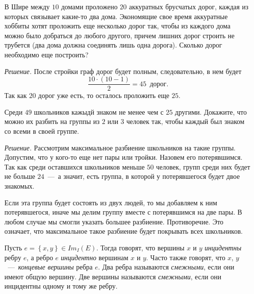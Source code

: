 \begin{example}
	В Шире между $10$ домами проложено $20$ аккуратных брусчатых дорог, каждая из которых связывает какие-то два дома. Экономящие свое время аккуратные хоббиты хотят проложить еще несколько дорог так, чтобы из каждого дома можно было добраться до любого другого, причем лишних дорог строить не трубется (два дома должна соединять лишь одна дорога). Сколько дорог необходимо еще построить?
	
	\emph{Решение.} После стройки граф дорог будет полным, следовательно, в нем будет 
	$$\frac{10 \cdot (10-1)}{2} = 45 \;\ \text{дорог}.$$
	Так как $20$ дорог уже есть, то осталось проложить еще $25$.
\end{example}

\begin{example}
	Среди $49$ школьников кажыдй знаком не менее чем с $25$ другими. Докажите, что можно их разбить на группы из $2$ или $3$ человек так, чтобы каждый был знаком со всеми в своей группе.
	
	\emph{Решение.} Рассмотрим максимальное разбиение школьников на такие группы. Допустим, что у кого-то еще нет пары или тройки. Назовем его потерявшимся. Так как среди оставшихся школьников меньше $50$ человек, групп среди них будет не больше $24$~---~а значит, есть группа, в которой у потерявшегося будет двое знакомых.
	
	Если эта группа будет состоять из двух людей, то мы добавляем к ним потерявшегося, иначе мы делим группу вместе с потерявшимся на две пары. В любом случае мы смогли указать большее разбиение. Противоречие. Это означает, что максимальное такое разбиение будет покрывать всех школьников.
\end{example}


\begin{definition}
	Пусть $e = \left\lbrace x, y \right\rbrace \in Im_{I}(E)$. Тогда говорят, что вершины $x$ и $y$ \emph{инцидентны} ребру $e$, а ребро $e$ \emph{инцидентно} вершинам $x$ и $y$. Часто также говорят, что $x$, $y$~---~\emph{концевые вершины} ребра $e$. Два ребра называются \emph{смежными}, если они имеют общую вершину. Две вершины называются \emph{смежными}, если они инцидентны одному и тому же ребру.
\end{definition}


